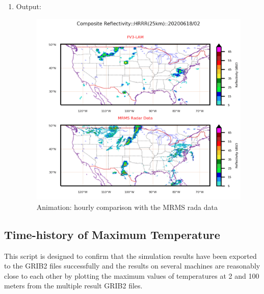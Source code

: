 \documentclass[11pt,fleqn]{report}              %
\begin{document}
\begin{enumerate}
\item Output:

\begin{figure}[H]
  \centering
  \includegraphics[width=0.8\linewidth]{fv3_out_ani_refl_comp_HRRR-2.png}
  \caption{Animation: hourly comparison with the MRMS rada data}
  \label{fig:py_ani_comp_refl}
\end{figure}

\end{enumerate}



\subsection{Time-history of Maximum Temperature}
\label{subsec:python_thist_grib2}

This script is designed to confirm that the simulation results have been exported to the GRIB2 files successfully and the results on several machines are reasonably close to each other by plotting the maximum values of temperatures at 2 and 100 meters from the multiple result GRIB2 files.
\end{document}
